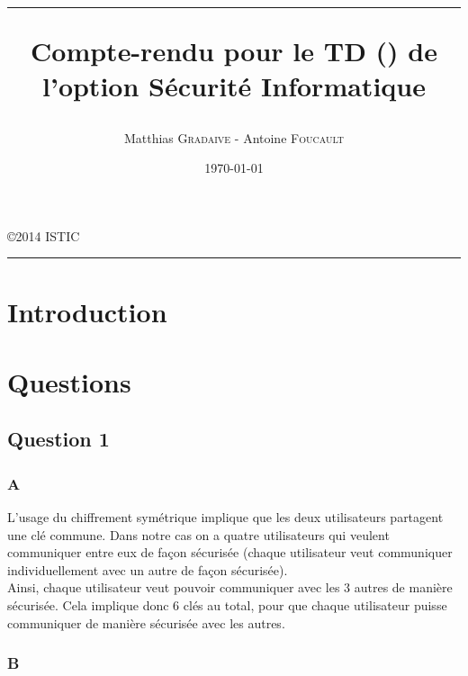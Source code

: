 \documentclass[a4paper, 11pt, oneside]{article}
\title{\hrule \vspace{1cm} Compte-rendu pour le TD (\no2) de l'option Sécurité Informatique}
\author{Matthias \textsc{Gradaive} - Antoine \textsc{Foucault}}
\date{\today}
\begin{document}
\pagestyle{fancy}
\lhead{}
\chead{}
\rhead{\leftmark}
\cfoot{}

\clearpage
\thispagestyle{empty}

\maketitle
\begin{center}
 \copyright 2014 ISTIC\\
\end{center}
\vspace{1cm}
\hrule
\thispagestyle{empty}

\newpage

\renewcommand{\contentsname}{Sommaire}
\tableofcontents
\thispagestyle{empty}
\newpage
\setcounter{page}{1}

\section*{Introduction}



\section{Questions}

\subsection{Question 1}

\subsubsection{A}

L'usage du chiffrement symétrique implique que les deux utilisateurs partagent une clé commune. Dans notre cas on a quatre utilisateurs qui veulent communiquer entre eux de façon sécurisée (chaque utilisateur veut communiquer individuellement avec un autre de façon sécurisée).\\
Ainsi, chaque utilisateur veut pouvoir communiquer avec les 3 autres de manière sécurisée. Cela implique donc 6 clés au total, pour que chaque utilisateur puisse communiquer de manière sécurisée avec les autres.

\subsubsection{B}
\end{document}
